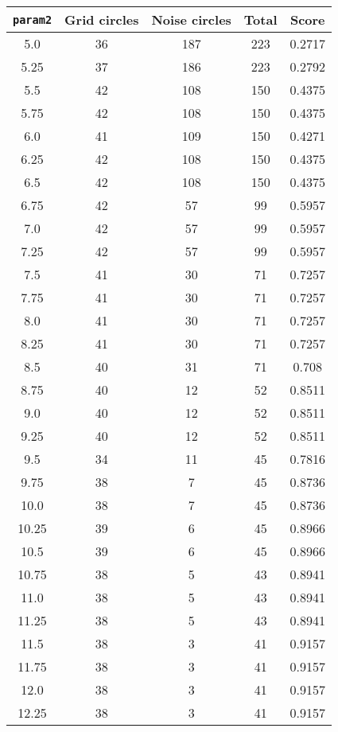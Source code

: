 \documentclass[letterpaper, 12pt]{article}
\begin{document}
\begin{longtable}{|c|c|c|c|c|}
\hline
\textbf{\texttt{param2}} & \textbf{Grid circles} & \textbf{Noise circles} & \textbf{Total} & \textbf{Score} \\
\hline
5.0 & 36 & 187 & 223 & 0.2717 \\
\hline
5.25 & 37 & 186 & 223 & 0.2792 \\
\hline
5.5 & 42 & 108 & 150 & 0.4375 \\
\hline
5.75 & 42 & 108 & 150 & 0.4375 \\
\hline
6.0 & 41 & 109 & 150 & 0.4271 \\
\hline
6.25 & 42 & 108 & 150 & 0.4375 \\
\hline
6.5 & 42 & 108 & 150 & 0.4375 \\
\hline
6.75 & 42 & 57 & 99 & 0.5957 \\
\hline
7.0 & 42 & 57 & 99 & 0.5957 \\
\hline
7.25 & 42 & 57 & 99 & 0.5957 \\
\hline
7.5 & 41 & 30 & 71 & 0.7257 \\
\hline
7.75 & 41 & 30 & 71 & 0.7257 \\
\hline
8.0 & 41 & 30 & 71 & 0.7257 \\
\hline
8.25 & 41 & 30 & 71 & 0.7257 \\
\hline
8.5 & 40 & 31 & 71 & 0.708 \\
\hline
8.75 & 40 & 12 & 52 & 0.8511 \\
\hline
9.0 & 40 & 12 & 52 & 0.8511 \\
\hline
9.25 & 40 & 12 & 52 & 0.8511 \\
\hline
9.5 & 34 & 11 & 45 & 0.7816 \\
\hline
9.75 & 38 & 7 & 45 & 0.8736 \\
\hline
10.0 & 38 & 7 & 45 & 0.8736 \\
\hline
10.25 & 39 & 6 & 45 & 0.8966 \\
\hline
10.5 & 39 & 6 & 45 & 0.8966 \\
\hline
10.75 & 38 & 5 & 43 & 0.8941 \\
\hline
11.0 & 38 & 5 & 43 & 0.8941 \\
\hline
11.25 & 38 & 5 & 43 & 0.8941 \\
\hline
11.5 & 38 & 3 & 41 & 0.9157 \\
\hline
11.75 & 38 & 3 & 41 & 0.9157 \\
\hline
12.0 & 38 & 3 & 41 & 0.9157 \\
\hline
12.25 & 38 & 3 & 41 & 0.9157 \\
\hline

\end{longtable}
\end{document}
